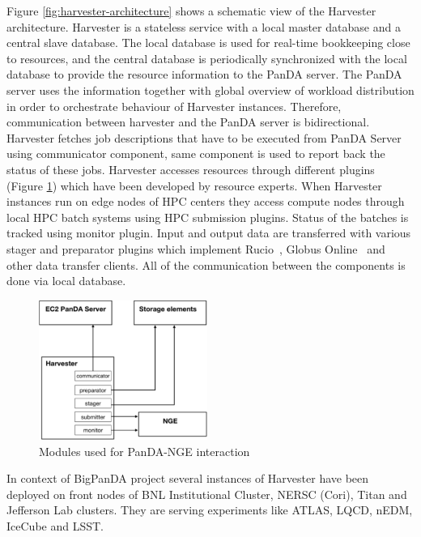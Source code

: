 \documentclass{webofc}
\begin{document}

Figure \ref{fig:harvester-architecture} shows a schematic view of the Harvester architecture. Harvester is a
stateless service with a local master database and a central slave database.
The local database is used for real-time bookkeeping close to resources, and
the central database is periodically synchronized with the local database to
provide the resource information to the PanDA server. The PanDA server uses
the information together with global overview of workload distribution in
order to orchestrate behaviour of Harvester instances. Therefore,
communication between harvester and the PanDA server is bidirectional.
Harvester fetches job descriptions that have to be executed from PanDA Server
using communicator component, same component is used to report back the
status of these jobs. Harvester accesses resources through different plugins
(Figure \ref{fig:harvester-modules}) which have been developed by resource experts. When Harvester
instances run on edge nodes of HPC centers they access compute nodes through
local HPC batch systems using HPC submission plugins. Status of the batches
is tracked using monitor plugin. Input and output data are transferred with
various stager and preparator plugins which implement
Rucio~\cite{garonne2014rucio}, Globus Online~\cite{foster2011globus}  and
other data transfer clients. All of the communication between the components
is done via local database.

\begin{figure}
	\centering
	\includegraphics[width=0.49\textwidth]{figures/panda-harvester-modules.pdf}
	\caption{Modules used for PanDA-NGE interaction}
	\label{fig:harvester-modules}
\end{figure}


In context of BigPanDA project several instances of Harvester have been
deployed on front nodes of BNL Institutional Cluster, NERSC (Cori), Titan and
Jefferson Lab clusters. They are serving experiments like ATLAS, LQCD, nEDM,
IceCube and LSST.
\end{document}
